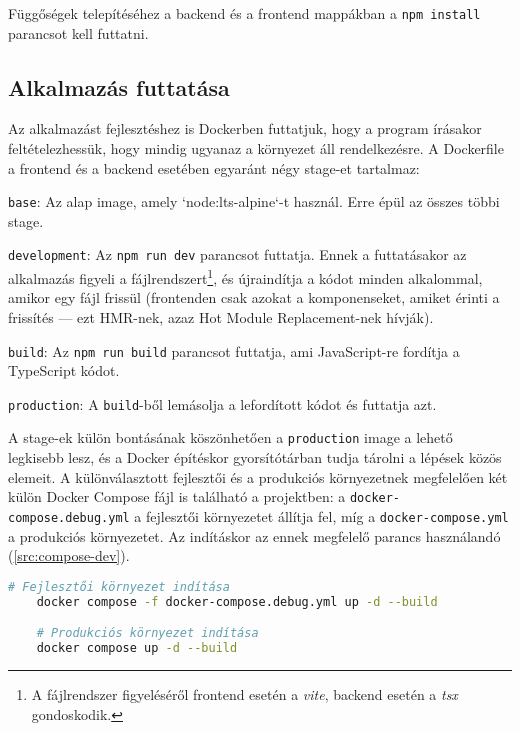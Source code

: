 Függőségek telepítéséhez a backend és a frontend mappákban a \texttt{npm install} parancsot kell futtatni.

\subsection{Alkalmazás futtatása}

Az alkalmazást fejlesztéshez is Dockerben futtatjuk, hogy a program írásakor feltételezhessük, hogy mindig ugyanaz a környezet áll rendelkezésre. A Dockerfile a frontend és a backend esetében egyaránt négy stage-et tartalmaz:

\begin{compactenum}
    \item \texttt{base}: Az alap image, amely `node:lts-alpine`-t használ. Erre épül az összes többi stage.
    \item \texttt{development}: Az \texttt{npm run dev} parancsot futtatja. Ennek a futtatásakor az alkalmazás figyeli a fájlrendszert\footnote{A fájlrendszer figyeléséről frontend esetén a \textit{vite}, backend esetén a \textit{tsx} gondoskodik.}, és újraindítja a kódot minden alkalommal, amikor egy fájl frissül (frontenden csak azokat a komponenseket, amiket érinti a frissítés --- ezt HMR-nek, azaz Hot Module Replacement-nek hívják\cite{hmr}).
    \item \texttt{build}: Az \texttt{npm run build} parancsot futtatja, ami JavaScript-re fordítja a TypeScript kódot.
    \item \texttt{production}: A \texttt{build}-ből lemásolja a lefordított kódot és futtatja azt.
\end{compactenum}

A stage-ek külön bontásának köszönhetően a \texttt{production} image a lehető legkisebb lesz, és a Docker építéskor gyorsítótárban tudja tárolni a lépések közös elemeit. A különválasztott fejlesztői és a produkciós környezetnek megfelelően két külön Docker Compose fájl is található a projektben: a \texttt{docker-compose.debug.yml} a fejlesztői környezetet állítja fel, míg a \texttt{docker-compose.yml} a produkciós környezetet. Az indításkor az ennek megfelelő parancs használandó (\ref{src:compose-dev}).

\begin{lstlisting}[language={bash}]
    # Fejlesztői környezet indítása
    docker compose -f docker-compose.debug.yml up -d --build

    # Produkciós környezet indítása
    docker compose up -d --build
\end{lstlisting}

